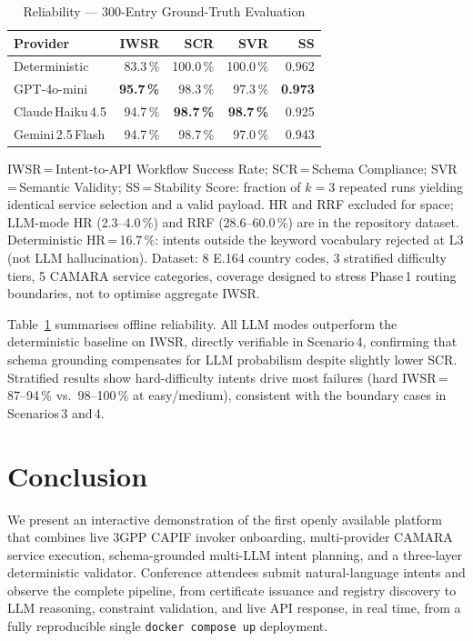 \documentclass[conference]{IEEEtran}
\begin{document}
\begin{table}[t]
\centering
\caption{Reliability --- 300-Entry Ground-Truth Evaluation}
\label{tab:metrics}
\small
\setlength{\tabcolsep}{3.5pt}
\begin{tabular}{lrrrr}
\toprule
\textbf{Provider} & \textbf{IWSR} & \textbf{SCR} & \textbf{SVR} & \textbf{SS} \\
\midrule
Deterministic      & 83.3\,\% & 100.0\,\% & 100.0\,\% & 0.962 \\
GPT-4o-mini        & \textbf{95.7\,\%} & 98.3\,\% & 97.3\,\% & \textbf{0.973} \\
Claude\,Haiku\,4.5 & 94.7\,\% & \textbf{98.7\,\%} & \textbf{98.7\,\%} & 0.925 \\
Gemini\,2.5\,Flash & 94.7\,\% & 98.7\,\% & 97.0\,\% & 0.943 \\
\bottomrule
\end{tabular}
\vspace{2pt}

\noindent\footnotesize
IWSR\,=\,Intent-to-API Workflow Success Rate; SCR\,=\,Schema
Compliance; SVR\,=\,Semantic Validity; SS\,=\,Stability Score:
fraction of $k\!=\!3$ repeated runs yielding identical service
selection and a valid payload.
HR and RRF excluded for space; LLM-mode HR (2.3--4.0\,\%) and
RRF (28.6--60.0\,\%) are in the repository dataset.
Deterministic HR\,=\,16.7\,\%: intents outside the keyword vocabulary
rejected at L3 (not LLM hallucination).
Dataset: 8 E.164 country codes, 3 stratified difficulty tiers,
5 CAMARA service categories, coverage designed to stress Phase\,1
routing boundaries, not to optimise aggregate IWSR.
\end{table}

Table~\ref{tab:metrics} summarises offline reliability.
All LLM modes outperform the deterministic baseline on IWSR,
directly verifiable in Scenario\,4, confirming that schema
grounding compensates for LLM probabilism despite slightly lower SCR.
Stratified results show hard-difficulty intents drive most failures
(hard IWSR\,=\,87--94\,\% vs.\ 98--100\,\% at easy/medium),
consistent with the boundary cases in Scenarios\,3 and\,4.


\section{Conclusion}
\label{sec:conclusion}


We present an interactive demonstration of the first openly available
platform that combines live 3GPP CAPIF invoker onboarding,
multi-provider CAMARA service execution, schema-grounded multi-LLM
intent planning, and a three-layer deterministic validator.
Conference attendees submit natural-language intents and observe the
complete pipeline, from certificate
issuance and registry discovery to LLM reasoning, constraint
validation, and live API response, in real time, from a
fully reproducible single \texttt{docker compose up} deployment.




\end{document}

